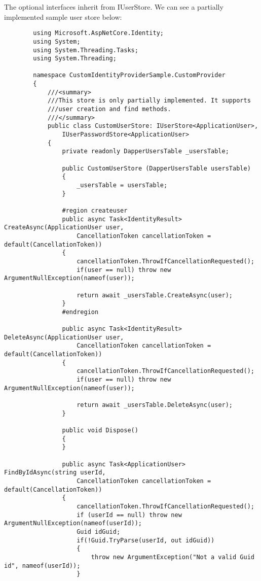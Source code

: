 \documentclass{report}
\begin{document}
    The optional interfaces inherit from IUserStore. We can see a partially
    implemented sample user store below:
    
    \lstset{style=sharpc}
    \begin{lstlisting}
        using Microsoft.AspNetCore.Identity;
        using System;
        using System.Threading.Tasks;
        using System.Threading;

        namespace CustomIdentityProviderSample.CustomProvider
        {
            ///<summary>
            ///This store is only partially implemented. It supports
            ///user creation and find methods.
            ///</summary>
            public class CustomUserStore: IUserStore<ApplicationUser>,
                IUserPasswordStore<ApplicationUser>
            {
                private readonly DapperUsersTable _usersTable;

                public CustomUserStore (DapperUsersTable usersTable)
                {
                    _usersTable = usersTable;
                }

                #region createuser
                public async Task<IdentityResult> CreateAsync(ApplicationUser user,
                    CancellationToken cancellationToken = default(CancellationToken))
                {
                    cancellationToken.ThrowIfCancellationRequested();
                    if(user == null) throw new ArgumentNullException(nameof(user));

                    return await _usersTable.CreateAsync(user);
                }
                #endregion

                public async Task<IdentityResult> DeleteAsync(ApplicationUser user,
                    CancellationToken cancellationToken = default(CancellationToken))
                {
                    cancellationToken.ThrowIfCancellationRequested();
                    if(user == null) throw new ArgumentNullException(nameof(user));

                    return await _usersTable.DeleteAsync(user);
                }

                public void Dispose()
                {
                }

                public async Task<ApplicationUser> FindByIdAsync(string userId, 
                    CancellationToken cancellationToken = default(CancellationToken))
                {
                    cancellationToken.ThrowIfCancellationRequested();
                    if (userId == null) throw new ArgumentNullException(nameof(userId));
                    Guid idGuid;
                    if(!Guid.TryParse(userId, out idGuid))
                    {
                        throw new ArgumentException("Not a valid Guid id", nameof(userId));
                    }


\end{lstlisting}
\end{document}
